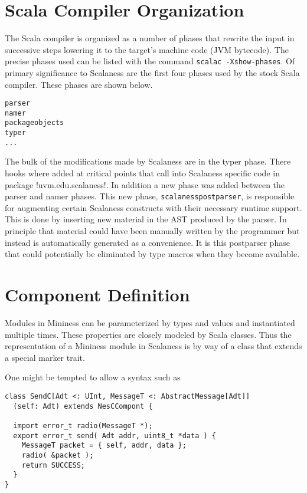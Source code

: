 \section{Scala Compiler Organization}
\label{section-scala-compiler-organization}

The Scala compiler is organized as a number of phases that rewrite the input in successive steps
lowering it to the target's machine code (JVM bytecode). The precise phases used can be listed
with the command \texttt{scalac -Xshow-phases}. Of primary significance to Scalaness are the
first four phases used by the stock Scala compiler. These phases are shown below.

\singlespace
\begin{Verbatim}
parser
namer
packageobjects
typer
...
\end{Verbatim}
\primaryspacing

The bulk of the modifications made by Scalaness are in the typer phase. There hooks where added
at critical points that call into Scalaness specific code in package !uvm.edu.scalaness!. In
addition a new phase was added between the parser and namer phases. This new phase,
\texttt{scalanesspostparser}, is responsible for augmenting certain Scalaness constructs with
their necessary runtime support. This is done by inserting new material in the AST produced by
the parser. In principle that material could have been manually written by the programmer but
instead is automatically generated as a convenience. It is this postparser phase that could
potentially be eliminated by type macros when they become available.

\section{Component Definition}
\label{section-component-definition}

Modules in Mininess can be parameterized by types and values and instantiated multiple times.
These properties are closely modeled by Scala classes. Thus the representation of a Mininess
module in Scalaness is by way of a class that extends a special marker trait.

One might be tempted to allow a syntax such as

\singlespace
\begin{lstlisting}[language=scalaness]
class SendC[Adt <: UInt, MessageT <: AbstractMessage[Adt]]
  (self: Adt) extends NesCCompont {

  import error_t radio(MessageT *);
  export error_t send( Adt addr, uint8_t *data ) {
    MessageT packet = { self, addr, data };
    radio( &packet );
    return SUCCESS;
  }
}
\end{lstlisting}
\primaryspacing

